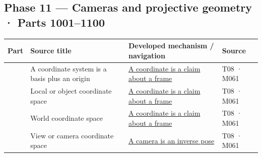\subsection{Phase 11 --- Cameras and projective geometry · Parts 1001--1100}\label{phase-11-cameras-and-projective-geometry-parts-10011100}

{\def\LTcaptype{none} %
\begin{longtable}[]{@{}
  >{\raggedleft\arraybackslash}p{}
  >{\raggedright\arraybackslash}p{}
  >{\raggedright\arraybackslash}p{}
  >{\raggedright\arraybackslash}p{}@{}}
\toprule\noalign{}
\begin{minipage}[b]{\linewidth}\raggedleft
Part
\end{minipage} & \begin{minipage}[b]{\linewidth}\raggedright
Source title
\end{minipage} & \begin{minipage}[b]{\linewidth}\raggedright
Developed mechanism / navigation
\end{minipage} & \begin{minipage}[b]{\linewidth}\raggedright
Source
\end{minipage} \\
\midrule\noalign{}
\endhead
\bottomrule\noalign{}
\endlastfoot
1001 & A coordinate system is a basis plus an origin & \href{Continuous\%20Notes/Computing\%20Foundations\%20-\%20From\%20Bits\%20to\%20C++\%20and\%20Systems\%20APIs\#A\%20coordinate\%20is\%20a\%20claim\%20about\%20a\%20frame/}{A coordinate is a claim about a frame} & T08 · M061 \\
1002 & Local or object coordinate space & \href{Continuous\%20Notes/Computing\%20Foundations\%20-\%20From\%20Bits\%20to\%20C++\%20and\%20Systems\%20APIs\#A\%20coordinate\%20is\%20a\%20claim\%20about\%20a\%20frame/}{A coordinate is a claim about a frame} & T08 · M061 \\
1003 & World coordinate space & \href{Continuous\%20Notes/Computing\%20Foundations\%20-\%20From\%20Bits\%20to\%20C++\%20and\%20Systems\%20APIs\#A\%20coordinate\%20is\%20a\%20claim\%20about\%20a\%20frame/}{A coordinate is a claim about a frame} & T08 · M061 \\
1004 & View or camera coordinate space & \href{Continuous\%20Notes/Computing\%20Foundations\%20-\%20From\%20Bits\%20to\%20C++\%20and\%20Systems\%20APIs\#A\%20camera\%20is\%20an\%20inverse\%20pose/}{A camera is an inverse pose} & T08 · M061 \\

\end{longtable}}
